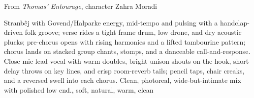 
\begin{notes}
From \emph{Thomas’ Entourage}, character Zahra Moradi
\end{notes}
\begin{style}
Stranbêj with Govend/Halparke energy, mid-tempo and pulsing with a handclap-driven folk groove; verse rides a tight frame drum, low drone, and dry acoustic plucks; pre-chorus opens with rising harmonies and a lifted tambourine pattern; chorus lands on stacked group chants, stomps, and a danceable call-and-response. %
Close-mic lead vocal with warm doubles, bright unison shouts on the hook, short delay throws on key lines, and crisp room-reverb tails; pencil taps, chair creaks, and a reversed swell into each chorus. %
Clean, photoreal, wide-but-intimate mix with polished low end., soft, natural, warm, clean
\end{style}
